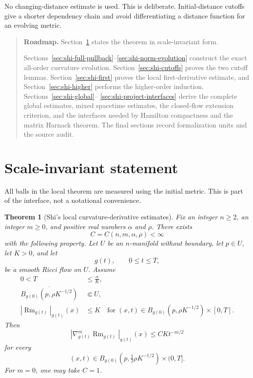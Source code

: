 \documentclass[10pt]{coll-l}
\newenvironment{roadmap}[1]{%
  \begin{quote}\small\noindent\textbf{Roadmap.} #1\par\medskip\noindent
}{\end{quote}}
\newtheorem{theorem}{Theorem}[chapter]
\theoremstyle{definition}
\theoremstyle{remark}
\numberwithin{section}{chapter}
\numberwithin{equation}{chapter}
\newcommand{\Rm}{\operatorname{Rm}}
\begin{document}
No changing-distance estimate is used.  This is deliberate.  Initial-distance
cutoffs give a shorter dependency chain and avoid differentiating a distance
function for an evolving metric.

\begin{roadmap}{Section~\ref{sec:shi-statement-scaling} states the theorem
in scale-invariant form.}
Sections~\ref{sec:shi-full-pullback}--\ref{sec:shi-norm-evolution} construct
the exact all-order curvature evolution.  Section~\ref{sec:shi-cutoffs}
proves the two cutoff lemmas.  Section~\ref{sec:shi-first} proves the local
first-derivative estimate, and Section~\ref{sec:shi-higher} performs the
higher-order induction.  Sections~\ref{sec:shi-global}--
\ref{sec:shi-project-interfaces} derive the complete global estimates,
mixed spacetime estimates, the closed-flow extension criterion, and the
interfaces needed by Hamilton compactness and the matrix Harnack theorem.
The final sections record formalization units and the source audit.
\end{roadmap}

\section{Scale-invariant statement}
\label{sec:shi-statement-scaling}

All balls in the local theorem are measured using the initial metric.  This
is part of the interface, not a notational convenience.

\begin{theorem}[Shi's local curvature-derivative estimates]
\label{thm:shi-local-derivatives}
Fix an integer $n\geq2$, an integer $m\geq0$, and positive real numbers
$\alpha$ and $\rho$.  There exists
\[
                 C=C(n,m,\alpha,\rho)<\infty
\]
with the following property.  Let $U$ be an $n$-manifold without boundary,
let $p\in U$, let $K>0$, and let
\[
                 g(t),\qquad 0\leq t\leq T,
\]
be a smooth Ricci flow on $U$.  Assume
\begin{align}
  0<T&\leq \frac{\alpha}{K},                              \label{eq:shi-time-hypothesis}\\
  \overline{B_{g(0)}(p,\rho K^{-1/2})}&\Subset U,          \label{eq:shi-compact-ball}\\
  |\Rm_{g(t)}|_{g(t)}(x)&\leq K
     \quad\text{for }(x,t)\in
     B_{g(0)}(p,\rho K^{-1/2})\times[0,T].                \label{eq:shi-curvature-hypothesis}
\end{align}
Then
\begin{equation}
 |\nabla_{g(t)}^{m}\Rm_{g(t)}|_{g(t)}(x)
       \leq C K t^{-m/2}                                 \label{eq:shi-main-estimate}
\end{equation}
for every
\[
 (x,t)\in B_{g(0)}(p,\tfrac12\rho K^{-1/2})\times(0,T].
\]
For $m=0$, one may take $C=1$.
\end{theorem}
\end{document}
